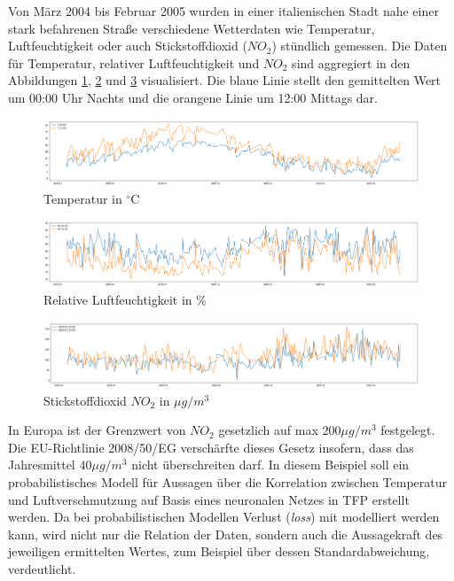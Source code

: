 \documentclass[12pt]{article}
\begin{document}
Von März 2004 bis Februar 2005 wurden in einer italienischen Stadt nahe einer stark befahrenen Straße verschiedene Wetterdaten wie Temperatur, Luftfeuchtigkeit oder auch Stickstoffdioxid ($NO_2$) stündlich gemessen. Die Daten für Temperatur, relativer Luftfeuchtigkeit und $NO_2$ sind aggregiert in den Abbildungen \ref{fig:temp}, \ref{fig:rh} und \ref{fig:no2} visualisiert. Die blaue Linie stellt den gemittelten Wert um 00:00 Uhr Nachts und die orangene Linie um 12:00 Mittags dar.

\begin{figure}[h]
    \centering
    \includegraphics[width=1.0\textwidth]{./figs/temp.png}
    \caption{Temperatur in $^\circ\text{C}$}
    \label{fig:temp}
\end{figure}

\begin{figure}[h]
    \centering
    \includegraphics[width=1.0\textwidth]{./figs/rh.png}
    \caption{Relative Luftfeuchtigkeit in \%}
    \label{fig:rh}
\end{figure}

\begin{figure}[h]
    \centering
    \includegraphics[width=1.0\textwidth]{./figs/no2.png}
    \caption{Stickstoffdioxid $NO_2$ in ${\mu g/m^3}$}
    \label{fig:no2}
\end{figure}

In Europa ist der Grenzwert von $NO_2$ gesetzlich auf max $200{\mu g/m^3}$ festgelegt. Die EU-Richtlinie 2008/50/EG verschärfte dieses Gesetz insofern, dass das Jahresmittel $40{\mu g/m^3}$ nicht überschreiten darf. In diesem Beispiel soll ein probabilistisches Modell für Aussagen über die Korrelation zwischen Temperatur und Luftverschmutzung auf Basis eines neuronalen Netzes in TFP erstellt werden. Da bei probabilistischen Modellen Verlust (\textit{loss}) mit modelliert werden kann, wird nicht nur die Relation der Daten, sondern auch die Aussagekraft des jeweiligen ermittelten Wertes, zum Beispiel über dessen Standardabweichung, verdeutlicht.
\end{document}
